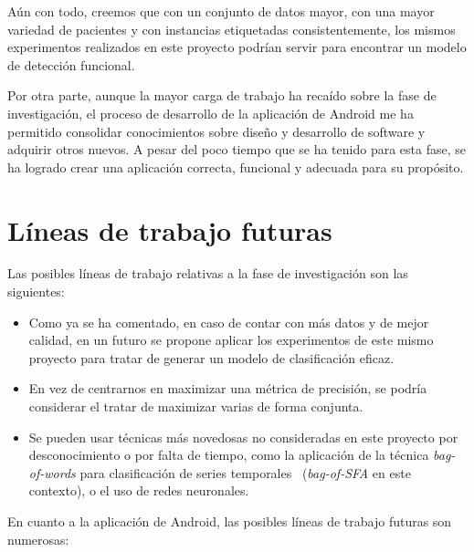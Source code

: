 Aún con todo, creemos que con un conjunto de datos mayor, con una mayor variedad de pacientes y con instancias etiquetadas consistentemente, los mismos experimentos realizados en este proyecto podrían servir para encontrar un modelo de detección funcional. 

Por otra parte, aunque la mayor carga de trabajo ha recaído sobre la fase de investigación, el proceso de desarrollo de la aplicación de Android me ha permitido consolidar conocimientos sobre diseño y desarrollo de software y adquirir otros nuevos. A pesar del poco tiempo que se ha tenido para esta fase, se ha logrado crear una aplicación correcta, funcional y adecuada para su propósito. 

\section{Líneas de trabajo futuras}

Las posibles líneas de trabajo relativas a la fase de investigación son las siguientes: 

\begin{itemize}
	\item Como ya se ha comentado, en caso de contar con más datos y de mejor calidad, en un futuro se propone aplicar los experimentos de este mismo proyecto para tratar de generar un modelo de clasificación eficaz. 
	\item En vez de centrarnos en maximizar una métrica de precisión, se podría considerar el tratar de maximizar varias de forma conjunta. 
	\item Se pueden usar técnicas más novedosas no consideradas en este proyecto por desconocimiento o por falta de tiempo, como la aplicación de la técnica \textit{bag-of-words} para clasificación de series temporales~\cite{bagofwords} (\textit{bag-of-SFA} en este contexto), o el uso de redes neuronales. 
\end{itemize}

En cuanto a la aplicación de Android, las posibles líneas de trabajo futuras son numerosas: 

